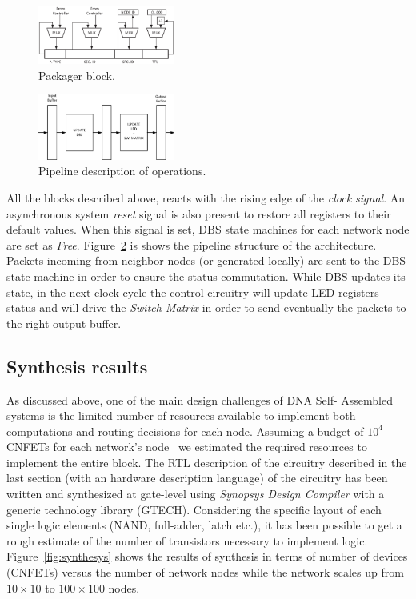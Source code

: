 \begin{figure}
  \centering
  \includegraphics[width=0.40\textwidth]{pictures/packager.eps}
  \caption{Packager block.}
 \label{fig:packager}
\end{figure}

\begin{figure}
  \centering
  \includegraphics[width=0.40\textwidth]{pictures/pipeline.eps}
  \caption{Pipeline description of \disr{} operations.}
 \label{fig:pipeline}
\end{figure}

All the blocks described above, reacts with the rising edge of
the \emph{clock signal}. An asynchronous system \emph{reset} signal is
also present to restore all registers to their default values. When
this signal is set, DBS state machines for each network
node are set as \emph{Free}.  
Figure~\ref{fig:pipeline} is shows the pipeline structure of the
\disr{} architecture. Packets incoming from neighbor nodes (or
generated locally) are sent to the DBS state machine in order to
ensure the status commutation. While DBS updates its state, in the
next clock cycle the control circuitry will update LED registers status and
will drive the \emph{Switch Matrix} in order to send eventually the packets to
the right output buffer.
\subsection{Synthesis results}

As discussed above, one of the main design challenges of DNA Self-
Assembled systems is the limited number of resources available to implement both
computations and routing decisions for each node. Assuming a budget of
$10^4$ CNFETs for each network's node~\cite{liu_jetcs}  we estimated
the required resources to implement the entire \disr{} block. The RTL
description of the circuitry described in the last section (with an
hardware description language)  of the \disr{} circuitry has been written
and synthesized at gate-level using \emph{Synopsys Design Compiler} with 
a generic technology library (GTECH).
Considering the specific layout of each single logic elements  (NAND,
full-adder, latch etc.), it has been possible to get a rough estimate
of the number of transistors necessary to implement \disr{} logic.
Figure~\ref{fig:synthesys} shows the results of synthesis in terms of
number of devices (CNFETs) versus the number of network nodes while
the network scales up from $10\times10$ to $100\times100$ nodes.


